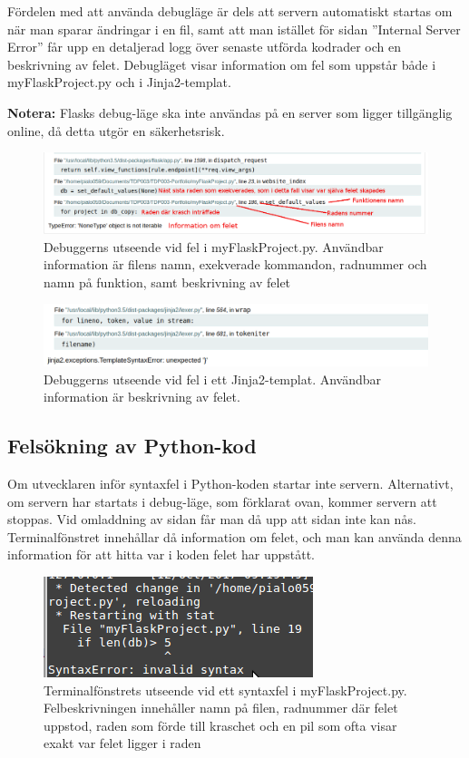 \documentclass{TDP003mall}
\begin{document}
Fördelen med att använda debugläge är dels att servern automatiskt startas om när man sparar ändringar i en fil, samt att man istället för sidan ''Internal Server Error'' får upp en detaljerad logg över senaste utförda kodrader och en beskrivning av felet.
Debugläget visar information om fel som uppstår både i myFlaskProject.py och i Jinja2-templat.

\textbf{Notera:} Flasks debug-läge ska inte användas på en server som ligger tillgänglig online, då detta utgör en säkerhetsrisk.

\begin{figure}
  \centering
  \includegraphics{flaskdebug1}
  \caption{Debuggerns utseende vid fel i myFlaskProject.py. Användbar information är filens namn, exekverade kommandon, radnummer och namn på funktion, samt beskrivning av felet}
\end{figure}

\begin{figure}
  \centering
  \includegraphics{flaskdebug2}
  \caption{Debuggerns utseende vid fel i ett Jinja2-templat. Användbar information är beskrivning av felet.}
\end{figure}
  

\subsection{Felsökning av Python-kod}
Om utvecklaren inför syntaxfel i Python-koden startar inte servern. Alternativt, om servern har startats i debug-läge, som förklarat ovan, kommer servern att stoppas. Vid omladdning av sidan får man då upp att sidan inte kan nås.
Terminalfönstret innehållar då information om felet, och man kan använda denna information för att hitta var i koden felet har uppstått.

\begin{figure}
  \centering
  \includegraphics{python_error}
  \caption{Terminalfönstrets utseende vid ett syntaxfel i myFlaskProject.py. Felbeskrivningen innehåller namn på filen, radnummer där felet uppstod, raden som förde till kraschet och en pil som ofta visar exakt var felet ligger i raden}
\end{figure}
\end{document}
